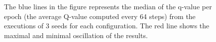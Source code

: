 \begin{figure}[t]
	\centering
	 \quad
	 \\
	 \quad
	 \\
	
	\caption{The blue lines in the figure represents the median of the q-value  per epoch (the average Q-value computed every 64 steps) from the executions of 3 seeds for each configuration. The red line shows the maximal and minimal oscillation of the results.}
	\label{fig:q-values}
\end{figure}